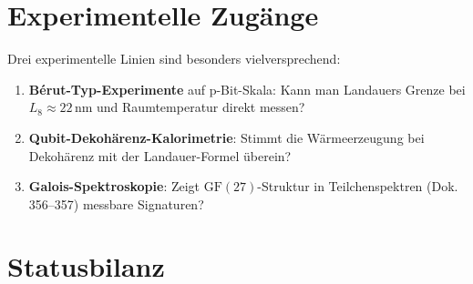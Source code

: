 \section{Experimentelle Zugänge}

Drei experimentelle Linien sind besonders vielversprechend:
\begin{enumerate}
  \item \textbf{Bérut-Typ-Experimente} auf p-Bit-Skala: Kann man Landauers Grenze
    bei $L_8 \approx 22\,\text{nm}$ und Raumtemperatur direkt messen?
  \item \textbf{Qubit-Dekohärenz-Kalorimetrie}: Stimmt die Wärmeerzeugung bei
    Dekohärenz mit der Landauer-Formel überein?
  \item \textbf{Galois-Spektroskopie}: Zeigt $\mathrm{GF}(27)$-Struktur in
    Teilchenspektren (Dok.\,356--357) messbare Signaturen?
\end{enumerate}

\section{Statusbilanz}

